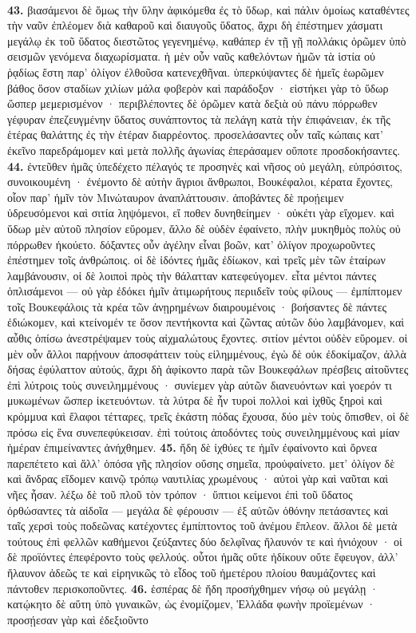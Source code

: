 \documentclass[a4paper, 11pt, oneside, polutonikogreek, german]{article}
\begin{document}
\paragraph{}
\textbf{43.} βιασάμενοι δὲ ὅμως τὴν ὕλην ἀφικόμεθα ἐς τὸ ὕδωρ, καὶ πάλιν ὁμοίως καταθέντες τὴν ναῦν ἐπλέομεν διὰ καθαροῦ καὶ διαυγοῦς ὕδατος, ἄχρι δὴ ἐπέστημεν χάσματι μεγάλῳ ἐκ τοῦ ὕδατος διεστῶτος γεγενημένῳ, καθάπερ ἐν τῇ γῇ πολλάκις ὁρῶμεν ὑπὸ σεισμῶν γενόμενα διαχωρίσματα. ἡ μὲν οὖν ναῦς καθελόντων ἡμῶν τὰ ἱστία οὐ ῥᾳδίως ἔστη παρ' ὀλίγον ἐλθοῦσα κατενεχθῆναι. ὑπερκύψαντες δὲ ἡμεῖς ἑωρῶμεν βάθος ὅσον σταδίων χιλίων μάλα φοβερὸν καὶ παράδοξον · εἱστήκει γὰρ τὸ ὕδωρ ὥσπερ μεμερισμένον · περιβλέποντες δὲ ὁρῶμεν κατὰ δεξιὰ οὐ πάνυ πόρρωθεν γέφυραν ἐπεζευγμένην ὕδατος συνάπτοντος τὰ πελάγη κατὰ τὴν ἐπιφάνειαν, ἐκ τῆς ἑτέρας θαλάττης ἐς τὴν ἑτέραν διαρρέοντος. προσελάσαντες οὖν ταῖς κώπαις κατ' ἐκεῖνο παρεδράμομεν καὶ μετὰ πολλῆς ἀγωνίας ἐπεράσαμεν οὔποτε προσδοκήσαντες. \textbf{44.} ἐντεῦθεν ἡμᾶς ὑπεδέχετο πέλαγός τε προσηνὲς καὶ νῆσος οὐ μεγάλη, εὐπρόσιτος, συνοικουμένη · ἐνέμοντο δὲ αὐτὴν ἄγριοι ἄνθρωποι, Βουκέφαλοι, κέρατα ἔχοντες, οἷον παρ' ἡμῖν τὸν Μινώταυρον ἀναπλάττουσιν. ἀποβάντες δὲ προῄειμεν ὑδρευσόμενοι καὶ σιτία ληψόμενοι, εἴ ποθεν δυνηθείημεν · οὐκέτι γὰρ εἴχομεν. καὶ ὕδωρ μὲν αὐτοῦ πλησίον εὕρομεν, ἄλλο δὲ οὐδὲν ἐφαίνετο, πλὴν μυκηθμὸς πολὺς οὐ πόρρωθεν ἠκούετο. δόξαντες οὖν ἀγέλην εἶναι βοῶν, κατ' ὀλίγον προχωροῦντες ἐπέστημεν τοῖς ἀνθρώποις. οἱ δὲ ἰδόντες ἡμᾶς ἐδίωκον, καὶ τρεῖς μὲν τῶν ἑταίρων λαμβάνουσιν, οἱ δὲ λοιποὶ πρὸς τὴν θάλατταν κατεφεύγομεν. εἶτα μέντοι πάντες ὁπλισάμενοι --- οὐ γὰρ ἐδόκει ἡμῖν ἀτιμωρήτους περιιδεῖν τοὺς φίλους --- ἐμπίπτομεν τοῖς Βουκεφάλοις τὰ κρέα τῶν ἀνῃρημένων διαιρουμένοις · βοήσαντες δὲ πάντες ἐδιώκομεν, καὶ κτείνομέν τε ὅσον πεντήκοντα καὶ ζῶντας αὐτῶν δύο λαμβάνομεν, καὶ αὖθις ὀπίσω ἀνεστρέψαμεν τοὺς αἰχμαλώτους ἔχοντες. σιτίον μέντοι οὐδὲν εὕρομεν. οἱ μὲν οὖν ἄλλοι παρῄνουν ἀποσφάττειν τοὺς εἰλημμένους, ἐγὼ δὲ οὐκ ἐδοκίμαζον, ἀλλὰ δήσας ἐφύλαττον αὐτούς, ἄχρι δὴ ἀφίκοντο παρὰ τῶν Βουκεφάλων πρέσβεις αἰτοῦντες ἐπὶ λύτροις τοὺς συνειλημμένους · συνίεμεν γὰρ αὐτῶν διανευόντων καὶ γοερόν τι μυκωμένων ὥσπερ ἱκετευόντων. τὰ λύτρα δὲ ἦν τυροὶ πολλοὶ καὶ ἰχθῦς ξηροὶ καὶ κρόμμυα καὶ ἔλαφοι τέτταρες, τρεῖς ἑκάστη πόδας ἔχουσα, δύο μὲν τοὺς ὄπισθεν, οἱ δὲ πρόσω εἰς ἕνα συνεπεφύκεισαν. ἐπὶ τούτοις ἀποδόντες τοὺς συνειλημμένους καὶ μίαν ἡμέραν ἐπιμείναντες ἀνήχθημεν. \textbf{45.} ἤδη δὲ ἰχθύες τε ἡμῖν ἐφαίνοντο καὶ ὄρνεα παρεπέτετο καὶ ἄλλ' ὁπόσα γῆς πλησίον οὔσης σημεῖα, προὐφαίνετο. μετ' ὀλίγον δὲ καὶ ἄνδρας εἴδομεν καινῷ τρόπῳ ναυτιλίας χρωμένους · αὐτοὶ γὰρ καὶ ναῦται καὶ νῆες ἦσαν. λέξω δὲ τοῦ πλοῦ τὸν τρόπον · ὕπτιοι κείμενοι ἐπὶ τοῦ ὕδατος ὀρθώσαντες τὰ αἰδοῖα --- μεγάλα δὲ φέρουσιν --- ἐξ αὐτῶν ὀθόνην πετάσαντες καὶ ταῖς χερσὶ τοὺς ποδεῶνας κατέχοντες ἐμπίπτοντος τοῦ ἀνέμου ἔπλεον. ἄλλοι δὲ μετὰ τούτους ἐπὶ φελλῶν καθήμενοι ζεύξαντες δύο δελφῖνας ἤλαυνόν τε καὶ ἡνιόχουν · οἱ δὲ προϊόντες ἐπεφέροντο τοὺς φελλούς. οὗτοι ἡμᾶς οὔτε ἠδίκουν οὔτε ἔφευγον, ἀλλ' ἤλαυνον ἀδεῶς τε καὶ εἰρηνικῶς τὸ εἶδος τοῦ ἡμετέρου πλοίου θαυμάζοντες καὶ πάντοθεν περισκοποῦντες. \textbf{46.} ἑσπέρας δὲ ἤδη προσήχθημεν νήσῳ οὐ μεγάλῃ · κατῴκητο δὲ αὕτη ὑπὸ γυναικῶν, ὡς ἐνομίζομεν, Ἑλλάδα φωνὴν προϊεμένων · προσῄεσαν γὰρ καὶ ἐδεξιοῦντο 
\end{document}
